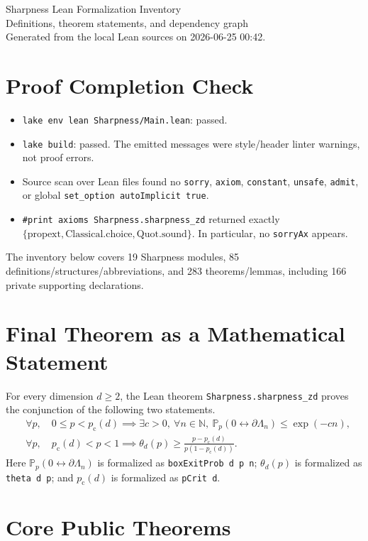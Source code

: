 \documentclass[10pt]{article}
\newcommand{\module}[1]{\texttt{#1}}
\newcommand{\pc}{p_{\mathrm{c}}}
\newcommand{\prob}{\mathbb P}
\begin{document}
\begin{center}
{\LARGE Sharpness Lean Formalization Inventory}\\[0.35em]
{\large Definitions, theorem statements, and dependency graph}\\[0.35em]
\small Generated from the local Lean sources on 2026-06-25 00:42.
\end{center}
\section*{Proof Completion Check}
\begin{itemize}\item \module{lake env lean Sharpness/Main.lean}: passed.\item \module{lake build}: passed. The emitted messages were style/header linter warnings, not proof errors.\item Source scan over Lean files found no \module{sorry}, \module{axiom}, \module{constant}, \module{unsafe}, \module{admit}, or global \module{set\_option autoImplicit true}.\item \module{\#print axioms Sharpness.sharpness\_zd} returned exactly \(\{\mathrm{propext}, \mathrm{Classical.choice}, \mathrm{Quot.sound}\}\). In particular, no \module{sorryAx} appears.\end{itemize}
The inventory below covers 19 Sharpness modules, 85 definitions/structures/abbreviations, and 283 theorems/lemmas, including 166 private supporting declarations.
\section*{Final Theorem as a Mathematical Statement}

For every dimension \(d \ge 2\), the Lean theorem \module{Sharpness.sharpness\_zd}
proves the conjunction of the following two statements.
\[
\begin{aligned}
&\forall p,\quad 0 \le p < \pc(d)
  \implies \exists c>0,\ \forall n\in\mathbb N,\ 
  \prob_p(0 \leftrightarrow \partial\Lambda_n)
  \le \exp(-c n),\\[0.4em]
&\forall p,\quad \pc(d)<p<1
  \implies
  \theta_d(p)\ge
  \frac{p-\pc(d)}{p(1-\pc(d))}.
\end{aligned}
\]
Here \(\prob_p(0 \leftrightarrow \partial\Lambda_n)\) is formalized as
\module{boxExitProb d p n}; \(\theta_d(p)\) is formalized as
\module{theta d p}; and \(\pc(d)\) is formalized as \module{pCrit d}.

\section*{Core Public Theorems}
\end{document}
